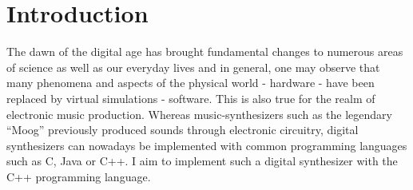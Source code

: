 \chapter{Introduction}

The dawn of the digital age has brought fundamental changes to numerous areas of science as well as our everyday lives and in general, one may observe that many phenomena and aspects of the physical world - hardware - have been replaced by virtual simulations - software. This is also true for the realm of electronic music production. Whereas music-synthesizers such as the legendary “Moog” previously produced sounds through electronic circuitry, digital synthesizers can nowadays be implemented with common programming languages such as C, Java or C++. I aim to implement such a digital synthesizer with the C++ programming language.
